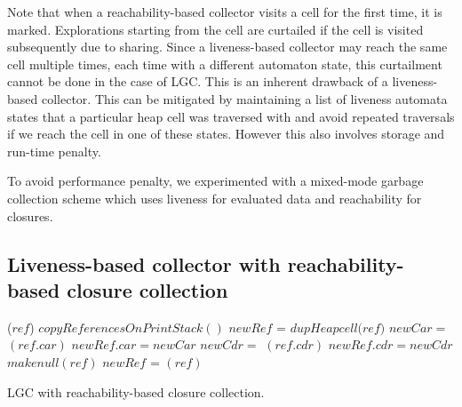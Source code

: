 \documentclass[9pt]{sigplanconf}
\begin{document}
Note that  when a reachability-based  collector visits a cell  for the
first time,  it is  marked.  Explorations starting  from the  cell are
curtailed if the cell is visited subsequently due to sharing.  Since a
liveness-based collector may reach the  same cell multiple times, each
time with a different automaton state, this curtailment cannot be done
in the case  of LGC. This is an inherent  drawback of a liveness-based
collector.  This  can be mitigated  by maintaining a list  of liveness
automata states  that a  particular heap cell  was traversed  with and
avoid repeated traversals if we reach the cell in one of these states.
However this also involves storage and run-time penalty.

To  avoid  performance  penalty,  we experimented  with  a  mixed-mode
garbage collection scheme  which uses liveness for  evaluated data and
reachability for closures.

\subsection{Liveness-based collector with reachability-based closure
  collection}
\begin{algorithm}[t]
  \Fn{\Lgc{}}
     {
            {\LCopy($\mathit{ref}$)\;}
            $\mathit{copyReferencesOnPrintStack()}$\;  
     }
        {
              {
                     {
                       $\mathit{newRef}$ =  $\mathit{dupHeapcell(ref})$\; 
                       $\mathit{ newCar}  =$  \LCopy$\mathit{(ref.car)}$\;
                       $\mathit{ newRef.car}   = \mathit{ newCar}$\;
                       $\mathit{ newCdr}  =$  \LCopy$\mathit{(ref.cdr)}$\;
                       $\mathit{ newRef.cdr}   = \mathit{newCdr}$\;
                     }
                     { $\mathit{makenull(ref)}$\;}}
              {
                    { 
                      $\mathit{newRef}$  = \RCopy$(\mathit{ref})$\;
                    }
              }
        }
        \caption{LGC with reachability-based closure collection.\label{algo:lgc-b}}
\end{algorithm}
\end{document}
